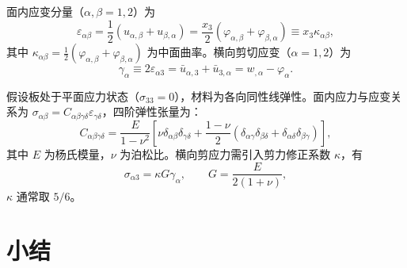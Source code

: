 面内应变分量（$\alpha,\beta=1,2$）为
\begin{equation}
\varepsilon_{\alpha\beta} = \frac{1}{2}(u_{\alpha,\beta}+u_{\beta,\alpha})
= \frac{x_3}{2}(\varphi_{\alpha,\beta}+\varphi_{\beta,\alpha})
\equiv x_3 \kappa_{\alpha\beta},
\label{eq:inplane-strain}
\end{equation}
其中 $\kappa_{\alpha\beta} = \frac{1}{2}(\varphi_{\alpha,\beta}+\varphi_{\beta,\alpha})$ 为中面曲率。横向剪切应变（$\alpha=1,2$）为
\begin{equation}
\gamma_\alpha \equiv 2\varepsilon_{\alpha 3} = \bar{u}_{\alpha,3}+\bar{u}_{3,\alpha}
= w_{,\alpha} - \varphi_\alpha.
\label{eq:transverse-shear-strain}
\end{equation}

假设板处于平面应力状态（$\sigma_{33}=0$），材料为各向同性线弹性。面内应力与应变关系为 $\sigma_{\alpha\beta}=C_{\alpha\beta\gamma\delta}\varepsilon_{\gamma\delta}$，四阶弹性张量为：
\begin{equation}
C_{\alpha\beta\gamma\delta} = \frac{E}{1-\nu^2}\left[\nu\delta_{\alpha\beta}\delta_{\gamma\delta} + \frac{1-\nu}{2}(\delta_{\alpha\gamma}\delta_{\beta\delta}+\delta_{\alpha\delta}\delta_{\beta\gamma})\right],
\label{eq:elastic-tensor}
\end{equation}
其中 $E$ 为杨氏模量，$\nu$ 为泊松比。横向剪应力需引入剪力修正系数 $\kappa$，有
\begin{equation}
\sigma_{\alpha 3} = \kappa G \gamma_\alpha, \qquad G = \frac{E}{2(1+\nu)},
\label{eq:shear-constitutive}
\end{equation}
$\kappa$ 通常取 $5/6$。

\section{小结}

